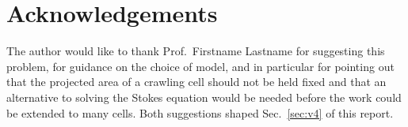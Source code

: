 \documentclass[11pt]{article}
\begin{document}


\section*{Acknowledgements}
The author would like to thank Prof.\ Firstname Lastname for suggesting this
problem, for guidance on the choice of model, and in particular for pointing out
that the projected area of a crawling cell should not be held fixed and that an
alternative to solving the Stokes equation would be needed before the work could
be extended to many cells. Both suggestions shaped
Sec.~\ref{sec:v4} of this report.

\end{document}
